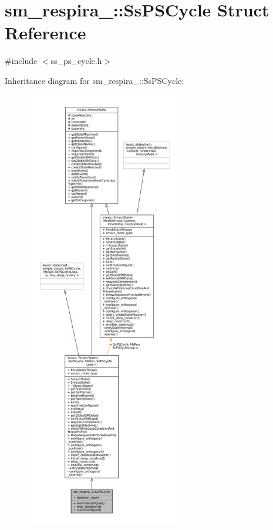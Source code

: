 \hypertarget{structsm__respira__1_1_1SsPSCycle}{}\section{sm\+\_\+respira\+\_\+:\+:Ss\+P\+S\+Cycle Struct Reference}
\label{structsm__respira__1_1_1SsPSCycle}


{\ttfamily \#include $<$ss\+\_\+ps\+\_\+cycle.\+h$>$}



Inheritance diagram for sm\+\_\+respira\+\_\+:\+:Ss\+P\+S\+Cycle\+:
\nopagebreak
\begin{figure}[H]
\begin{center}
\leavevmode
\includegraphics[height=550pt]{structsm__respira__1_1_1SsPSCycle__inherit__graph}
\end{center}
\end{figure}


